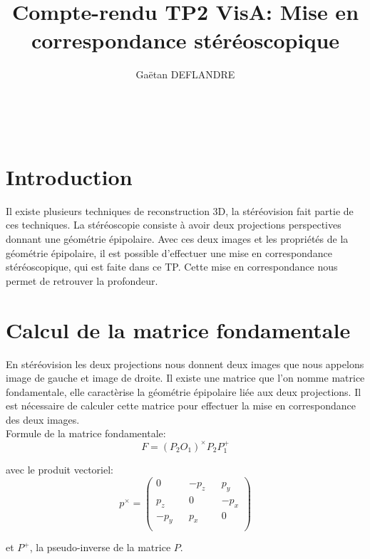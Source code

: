 \documentclass[a4paper,11pt]{article}
\title{
  \noindent\hrulefill \\
  \vspace{10mm} Compte-rendu TP2 VisA: Mise en correspondance stéréoscopique
}
\author{Gaëtan DEFLANDRE}
\begin{document}
\maketitle

\noindent\hrulefill \\


\section{Introduction}
Il existe plusieurs techniques de reconstruction 3D, la stéréovision fait partie de ces techniques.
La stéréoscopie consiste à avoir deux projections perspectives donnant une géométrie épipolaire. 
Avec ces deux images et les propriétés de la géométrie épipolaire, il est possible d'effectuer une 
mise en correspondance stéréoscopique, qui est faite dans ce TP. Cette mise en correspondance nous 
permet de retrouver la profondeur.\\

\newpage

\section{Calcul de la matrice fondamentale}

En stéréovision les deux projections nous donnent deux images que nous appelons image de gauche et 
image de droite. Il existe une matrice que l'on nomme matrice fondamentale, elle caractèrise la 
géométrie épipolaire liée aux deux projections. Il est nécessaire de calculer cette matrice pour 
effectuer la mise en correspondance des deux images.\\


Formule de la matrice fondamentale:
$$
F = (P_2 O_1)^{\times} P_2 P_1^+
$$

avec le produit vectoriel:
$$
p^{\times} = 
\begin{pmatrix}
  0 && -p_z && p_y \\
  p_z && 0 && -p_x \\
  -p_y && p_x && 0 \\
\end{pmatrix}
$$

et $P^+$, la pseudo-inverse de la matrice $P$.\\
\end{document}
